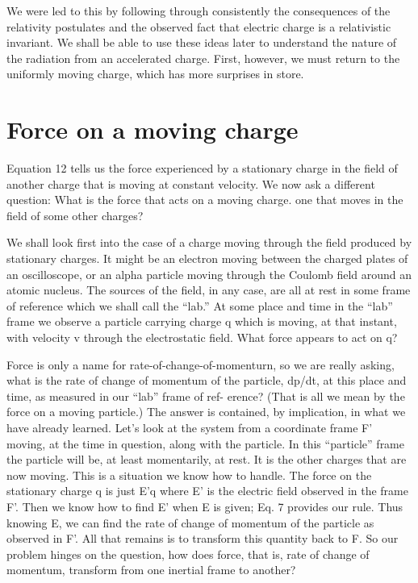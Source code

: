 We were led to this by following through consistently the consequences
of the relativity postulates and the observed fact that electric
charge is a relativistic invariant. We shall be able to use these ideas
later to understand the nature of the radiation from an accelerated
charge. First, however, we must return to the uniformly moving
charge, which has more surprises in store.

\section{Force on a moving charge}

Equation 12 tells us the force experienced by a stationary charge
in the field of another charge that is moving at constant velocity.
We now ask a different question: What is the force that acts on a
moving charge. one that moves in the field of some other charges?

We shall look first into the case of a charge moving through the field
produced by stationary charges. It might be an electron moving
between the charged plates of an oscilloscope, or an alpha particle
moving through the Coulomb field around an atomic nucleus. The
sources of the field, in any case, are all at rest in some frame of reference
which we shall call the ``lab.'' At some place and time in the
``lab'' frame we observe a particle carrying charge q which is moving,
at that instant, with velocity v through the electrostatic field. What
force appears to act on q?

Force is only a name for rate-of-change-of-momenturn, so we are
really asking, what is the rate of change of momentum of the particle,
dp/dt, at this place and time, as measured in our ``lab'' frame of ref-
erence? (That is all we mean by the force on a moving particle.)
The answer is contained, by implication, in what we have already
learned. Let's look at the system from a coordinate frame F' moving,
at the time in question, along with the particle. In this ``particle''
frame the particle will be, at least momentarily, at rest. It is the
other charges that are now moving. This is a situation we know
how to handle. The force on the stationary charge q is just E'q where
E' is the electric field observed in the frame F'. Then we know how
to find E' when E is given; Eq. 7 provides our rule. Thus knowing
E, we can find the rate of change of momentum of the particle as
observed in F'. All that remains is to transform this quantity back
to F. So our problem hinges on the question, how does force, that
is, rate of change of momentum, transform from one inertial frame
to another?

